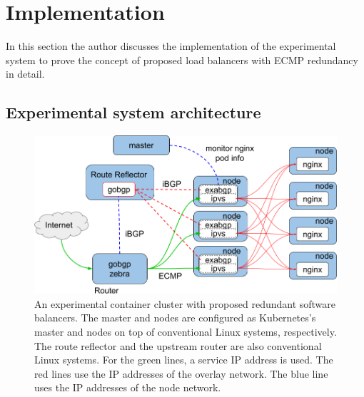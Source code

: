 \section{Implementation}

In this section the author discusses the implementation of the experimental system to prove the concept of  proposed load balancers with ECMP redundancy in detail.

\subsection{Experimental system architecture}\label{sec:poc}

\begin{figure}[tb]
\centering
\includegraphics[width=0.8\columnwidth]{Figs/poc.png}

\par\bigskip
\centering
\begin{minipage}{0.9\columnwidth}
  \caption[An experimental container cluster with proposed redundant software balancers]{
    An experimental container cluster with proposed redundant software balancers.
    The master and nodes are configured as Kubernetes's master and nodes on top of conventional Linux systems, respectively.
    The route reflector and the upstream router are also conventional Linux systems.
    For the green lines, a service IP address is used. The red lines use the IP addresses of the overlay network. The blue line uses the IP addresses of the node network.
  }
  \label{fig:poc}
\end{minipage}

\end{figure}

